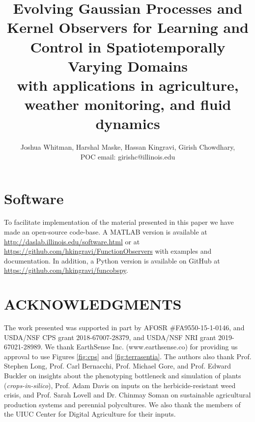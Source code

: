 \documentclass[letterpaper,12pt,peerreviewca,draftcls]{IEEEtran}
\title{Evolving Gaussian Processes and Kernel Observers for Learning and Control in Spatiotemporally Varying Domains\\\Large with applications in agriculture, weather monitoring, and fluid dynamics}
\author{Joshua Whitman, Harshal Maske, Hassan Kingravi, Girish Chowdhary, \\ POC email: girishc@illinois.edu}
\newcommand{\mX}[1]{\added[id=ml,remark={}]{#1}}
\newcommand{\bX}[1]{\added[id=bc,remark={}]{#1}}
\begin{document}
\maketitle
\CSMsetup
\linenumbers \modulolinenumbers[5] %







   




\section{Software}
To facilitate implementation of the material presented in this paper we have made an open-source code-base. A MATLAB version is available at \url{http://daslab.illinois.edu/software.html} or at \url{https://github.com/hkingravi/FunctionObservers} with examples and documentation. In addition, a  Python version is available on GitHub at \url{https://github.com/hkingravi/funcobspy}.

\section{ACKNOWLEDGMENTS}
The work presented was supported in part by AFOSR \#FA9550-15-1-0146, %
and USDA/NSF CPS grant 2018-67007-28379, and USDA/NSF NRI grant 2019-67021-28989.  We thank EarthSense Inc. (www.earthsense.co) for providing us approval to use Figures \ref{fig:cps} and \ref{fig:terrasentia}. The authors also thank Prof. Stephen Long, Prof. Carl Bernacchi, Prof. Michael Gore, and Prof. Edward Buckler on insights about the phenotyping bottleneck and simulation of plants (\textit{crops-in-silico}), Prof. Adam Davis on inputs on the herbicide-resistant weed crisis, and Prof. Sarah Lovell and Dr. Chinmay Soman on sustainable agricultural production systems and perennial polycultures. We also thank the members of the UIUC Center for Digital Agriculture for their inputs.

%

\end{document}
